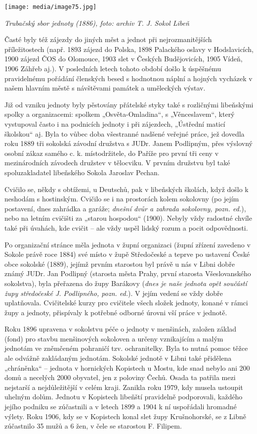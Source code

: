 \texttt{[image: media/image75.jpg]}

\emph{Trubačský sbor jednoty (1886), foto: archiv T. J. Sokol Libeň}

Časté byly též zájezdy do jiných měst a jednot při nejrozmanitějších
příležitostech (např. 1893 zájezd do Polska, 1898 Palackého oslavy v
Hodslavicích, 1900 zájezd ČOS do Olomouce, 1903 slet v Českých
Budějovicích, 1905 Vídeň, 1906 Záhřeb aj.). V posledních letech tohoto
období došlo k úspěšnému pravidelnému pořádání členských besed s
hodnotnou náplní a hojných vycházek v našem hlavním městě s návštěvami
památek a uměleckých výstav.

Již od vzniku jednoty byly pěstovány přátelské styky také s rozličnými
libeňskými spolky a organizacemi: spolkem „Osvěta-Omladina``, s
„Věnceslavem``, který vystupoval často i na podnicích jednoty i při
zájezdech, „Ústřední maticí školskou`` aj. Byla to vůbec doba všestranné
nadšené veřejné práce, jež dovedla roku 1889 tři sokolská závodní
družstva s JUDr. Janem Podlipným, přes výslovný osobní zákaz samého c.
k. místodržitele, do Paříže pro první tři ceny v mezinárodních závodech
družstev v tělocviku. V prvním družstvu byl také spoluzakladatel
libeňského Sokola Jaroslav Pechan.

Cvičilo se, někdy s obtížemi, u Deutschů, pak v libeňských školách, když
došlo k neshodám s hostinským. Cvičilo se i na prostorách kolem
sokolovny (po jejím postavení, dnes zahrádka a garáže; \emph{dnešní dvůr
a zahrada sokolovny, pozn. ed.}), nebo na letním cvičišti za „starou
hospodou`` (1900). Nebyly vždy radostné chvíle také při úvahách, kde
cvičit -- ale vždy uspěl lidský rozum a pocit odpovědnosti.

Po organizační stránce měla jednota v župní organizaci (župní zřízení
zavedeno v Sokole právě roce 1884) své místo v župě Středočeské a teprve
po ustavení České obce sokolské (1889), jejímž prvním starostou byl
právě u nás v Libni dobře známý JUDr. Jan Podlipný (starosta města
Prahy, první starosta Všeslovanského sokolstva), byla přeřazena do župy
Barákovy (\emph{dnes je naše jednota opět součástí župy středočeské J.
Podlipného, pozn. ed.}). V jejím vedení se vždy dobře uplatňovala.
Cvičitelské kurzy pro cvičitele všech složek jednoty, konané v rámci
župy a jednoty, přispívaly k potřebné odborné úrovni vší práce v
jednotě.

Roku 1896 upravena v sokolstvu péče o jednoty v menšinách, založen
základ (fond) pro stavbu menšinových sokoloven a určeny vznikajícím a
malým jednotám ve zněmčeném pohraničí tzv. ochranitelky. Byla to nutná
pomoc těžce ale odvážně zakládaným jednotám. Sokolské jednotě v Libni
také přidělena „chráněnka`` -- jednota v hornických Kopistech u Mostu,
kde snad nebylo ani 200 domů a necelých 2000 obyvatel, jen z poloviny
Čechů. Osada ta patřila mezi nejstarší a nejdůležitější v celém kraji.
Zanikla roku 1979, kdy musela ustoupit uhelným dolům. Jednotu v
Kopistech libeňští pravidelně podporovali, každého jejího podniku se
zúčastnili a v letech 1899 a 1904 k ní uspořádali hromadné výlety. Roku
1906, kdy se v Kopistech konal slet župy Krušnohorské, se z Libně
zúčastnilo 35 mužů a 6 žen, v čele se starostou F. Filipem.

